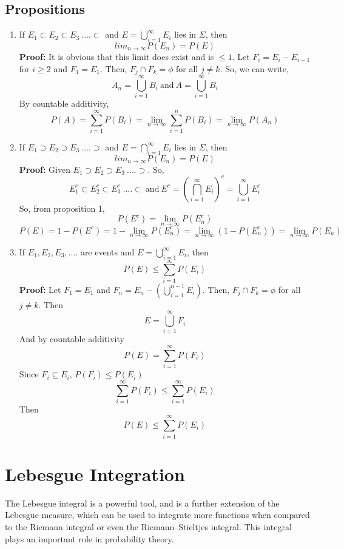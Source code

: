 \documentclass{article}
\begin{document}
\subsection{Propositions}
\begin{enumerate}
	\item If $E_1 \subset E_2 \subset E_3 \ ....\subset$ and $E = \bigcup \limits_{i=1}^\infty E_i$ lies in $\Sigma$, then 
	$$lim_{n \rightarrow \infty}P(E_n) = P(E)$$
	\textbf{Proof: }It is obvious that this limit does exist and is $\leq 1$. Let $F_i = E_i - E_{i-1}$ for $i \geq 2$ and $F_1 = E_1$. Then, $F_j \cap F_k = \phi$ for all $j \neq k$. So, we can write,
	$$A_n = \bigcup \limits_{i=1}^\infty B_i \ \textrm{and}\  A = \bigcup \limits_{i=1}^\infty B_i$$
	By countable additivity,
	$$P(A) = \sum \limits_{i=1}^\infty P(B_i) = \lim_{n \rightarrow \infty } \sum \limits_{i=1}^n P(B_i) = \lim_{n \rightarrow \infty}P(A_n) $$
	\item If $E_1 \supset E_2 \supset E_3 \ ....\supset$ and $E = \bigcap \limits_{i=1}^\infty E_i$ lies in $\Sigma$, then 
	$$lim_{n \rightarrow \infty}P(E_n) = P(E)$$
	\textbf{Proof: } Given $E_1 \supset E_2 \supset E_3 \ ....\supset$. So, $$E_1^c \subset E_2^c \subset E_3^c \ ....\subset \ \textrm{and}\  E^c =  (\bigcap \limits_{i=1}^\infty E_i)^c = \bigcup \limits_{i=1}^\infty E_i^c$$
	So, from proposition 1,
	$$P(E^c) = \lim_{n \rightarrow \infty}P(E_n^c)$$
	$$P(E) = 1 - P(E^c) = 1 - \lim_{n \rightarrow \infty}P(E_n^c) = \lim_{n \rightarrow \infty}(1- P(E_n^c)) = \lim_{n \rightarrow \infty}P(E_n)$$
	\item If $E_1, E_2, E_3,....$ are events and $E = \bigcup \limits_{i=1}^\infty E_i$, then 
	$$P(E) \leq \sum \limits_{i=1}^\infty P(E_i)$$
	\textbf{Proof: }Let $F_1 = E_1$ and $F_n = E_n - (\bigcup \limits_{i=1}^{n-1}E_i)$. Then, $F_j \cap F_k = \phi $ for all $j \neq k$. Then
	$$E = \bigcup \limits_{i=1}^\infty F_i$$
	And by countable additivity
	$$P(E) = \sum \limits_{i=1}^\infty P(F_i)$$
	Since $F_i \subseteq E_i$, $P(F_i) \leq P(E_i)$
	$$\sum \limits_{i=1}^\infty P(F_i) \leq \sum \limits_{i=1}^\infty P(E_i)$$
	Then
	$$P(E) \leq \sum \limits_{i=1}^\infty P(E_i)$$
	

\end{enumerate}
\newpage
\section{Lebesgue Integration}

The Lebesgue integral is a powerful tool, and is a further extension of the Lebesgue measure, which can be used to integrate more functions when compared to the Riemann integral or even the Riemann–Stieltjes integral. 
This integral plays an important role in probability theory.
\end{document}
